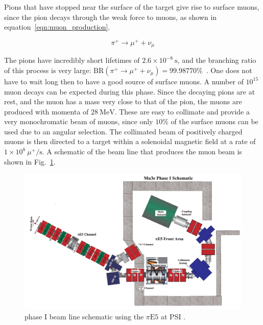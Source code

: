 Pions that have stopped near the surface of the target give rise to surface muons, since the pion decays through the weak force to muons, as shown in equation~\ref{eqn:muon_production}.

\begin{equation}
\label{eqn:muon_production}
\pi^+ \rightarrow \mu^+ + \nu_\mu
\end{equation}

\noindent The pions have incredibly short lifetimes of $2.6 \times 10^{-8}~\textrm{s}$, and the branching ratio of this process is very large: $\textrm{BR}(\pi^+ \rightarrow \mu^+ + \nu_\mu) = 99.98770\%$~\cite{Agashe:2014kda}.
One does not have to wait long then to have a good source of surface muons.
A number of $10^{15}$ muon decays can be expected during this phase.
Since the decaying pions are at rest, and the muon has a mass very close to that of the pion, the muons are produced with momenta of $28~\textrm{MeV}$.
These are easy to collimate and provide a very monochromatic beam of muons, since only $10\%$ of the surface muons can be used due to an angular selection.
The collimated beam of positively charged muons is then directed to a target within a solenoidal magnetic field at a rate of $1 \times 10^8~\mu^+/\textrm{s}$.
A schematic of the beam line that produces the muon beam is shown in Fig.~\ref{fig:mu3e_phaseI_schematic}.

\begin{figure}[h]
    \centering
    \includegraphics[width = \textwidth]{Figures/experiments/mu3e_phase1_schematic.png}
    \caption[\mueee phase I beam line schematic using the $\pi\textrm{E5}$ at PSI.]{\mueee phase I beam line schematic using the $\pi\textrm{E5}$ at PSI \cite{Blondel:2013ia}.}
    \label{fig:mu3e_phaseI_schematic}
\end{figure}


